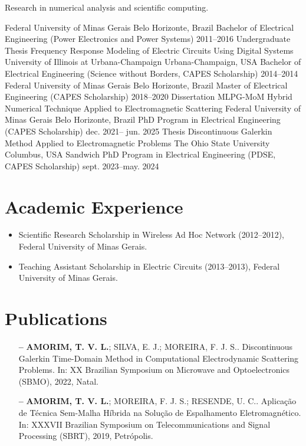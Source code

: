 \documentclass{cv}
\newenvironment{AcademicExperience}{
    \section{Academic Experience}
    \begin{itemize}[leftmargin=10pt, noitemsep]
        }{
    \end{itemize}
}
\newcommand{\academicitem}[4]{%
\item[\textbf{--}] #1 (#2--#3), #4.
}
\begin{document}

\begin{Objective}
    Research in numerical analysis and scientific computing.
\end{Objective}

\begin{Education}
    \educationsubsection
    {Federal University of Minas Gerais}
    {Belo Horizonte, Brazil}
    {Bachelor of Electrical Engineering (Power Electronics and Power Systems)}
    {2011--2016}
    {Undergraduate Thesis}
    {Frequency Response Modeling of Electric Circuits Using Digital Systems}
    \educationsubsection
    {University of Illinois at Urbana-Champaign}
    {Urbana-Champaign, USA}
    {Bachelor of Electrical Engineering (Science without Borders,
    CAPES Scholarship)}
    {2014--2014}
    {}
    {}
    \educationsubsection
    {Federal University of Minas Gerais}
    {Belo Horizonte, Brazil}
    {Master of Electrical Engineering (CAPES Scholarship)}
    {2018--2020}
    {Dissertation}
    {MLPG-MoM Hybrid Numerical Technique Applied to Electromagnetic Scattering}
    \educationsubsection
    {Federal University of Minas Gerais}
    {Belo Horizonte, Brazil}
    {PhD Program in Electrical Engineering (CAPES Scholarship)}
    {dec. 2021-- jun. 2025}
    {Thesis}
    {Discontinuous Galerkin Method Applied to Electromagnetic Problems}
    \educationsubsection
    {The Ohio State University}
    {Columbus, USA}
    {Sandwich PhD Program in Electrical Engineering (PDSE, CAPES Scholarship)}
    {sept. 2023--may. 2024}
    {}
    {}
\end{Education}

\begin{AcademicExperience}
    \academicitem{Scientific Research Scholarship in Wireless Ad Hoc
    Network}{2012}{2012}{Federal University of Minas Gerais}
    \academicitem{Teaching Assistant Scholarship in Electric
    Circuits}{2013}{2013}{Federal University of Minas Gerais}
\end{AcademicExperience}

\section{Publications}
\begin{itemize}[leftmargin=10pt]
    \item[\textbf{--}] \textbf{AMORIM, T. V. L.}; SILVA, E. J.;
        MOREIRA, F. J. S.. Discontinuous Galerkin Time-Domain Method
        in Computational Electrodynamic Scattering Problems. In: XX
        Brazilian Symposium on Microwave and Optoelectronics (SBMO),
        2022, Natal.
    \item[\textbf{--}] \textbf{AMORIM, T. V. L.}; MOREIRA, F. J. S.;
        RESENDE, U. C.. Aplicação de Técnica Sem-Malha Híbrida na
        Solução de Espalhamento Eletromagnético. In: XXXVII Brazilian
        Symposium on Telecommunications and Signal Processing (SBRT),
        2019, Petrópolis.
\end{itemize}
\end{document}
